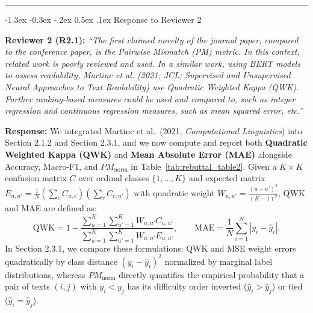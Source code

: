 \documentclass[11pt,a4paper]{article}
\makeatletter
\renewcommand\section{\@startsection {section}{1}{\z@}%
  {-1.3ex \@plus -0.3ex \@minus -.2ex}%
  {0.5ex \@plus.1ex}%
  {\normalfont\large\bfseries}}
\makeatother
\begin{document}
\medskip
\noindent\rule{\textwidth}{0.4pt}

\section{Response to Reviewer 2}

\begin{reviewbox}
\textbf{Reviewer 2 (R2.1):} \textit{``The first claimed novelty of the journal paper, compared to the conference paper, is the Pairwise Mismatch (PM) metric. In this context, related work is poorly reviewed and used. In a similar work, using BERT models to assess readability, Martinc et al. (2021; JCL; Supervised and Unsupervised Neural Approaches to Text Readability) use Quadratic Weighted Kappa (QWK). Further ranking-based measures could be used and compared to, such as integer regression and continuous regression measures, such as mean squared error, etc.''}
\end{reviewbox}

\noindent\textbf{Response:}
We integrated Martinc et al.\ (2021, \textit{Computational Linguistics}) \cite{martinc2021supervised} into Section 2.1.2 and Section 2.3.1, and we now compute and report both \textbf{Quadratic Weighted Kappa (QWK)} and \textbf{Mean Absolute Error (MAE)} alongside Accuracy, Macro-F1, and $PM_{\text{norm}}$ in Table~\ref{tab:rebuttal_table2}. Given a $K \times K$ confusion matrix $C$ over ordinal classes $\{1, \dots, K\}$ and expected matrix $E_{u,u'} = \frac{1}{N} \left(\sum_c C_{u,c}\right)\left(\sum_r C_{r,u'}\right)$ with quadratic weight $W_{u,u'} = \frac{(u - u')^2}{(K - 1)^2}$, QWK and MAE are defined as:
\begin{equation}
\text{QWK} = 1 - \frac{\sum_{u=1}^{K}\sum_{u'=1}^{K} W_{u,u'} C_{u,u'}}{\sum_{u=1}^{K}\sum_{u'=1}^{K} W_{u,u'} E_{u,u'}}, \qquad \text{MAE} = \frac{1}{N}\sum_{i=1}^{N} |y_i - \hat{y}_i|.
\label{eq:rebuttal_qwk_mae}
\end{equation}
In Section 2.3.1, we compare these formulations: QWK and MSE weight errors quadratically by class distance $(y_i - \hat{y}_i)^2$ normalized by marginal label distributions, whereas $PM_{\text{norm}}$ directly quantifies the empirical probability that a pair of texts $(i, j)$ with $y_i < y_j$ has its difficulty order inverted ($\hat{y}_i > \hat{y}_j$) or tied ($\hat{y}_i = \hat{y}_j$).
\end{document}
